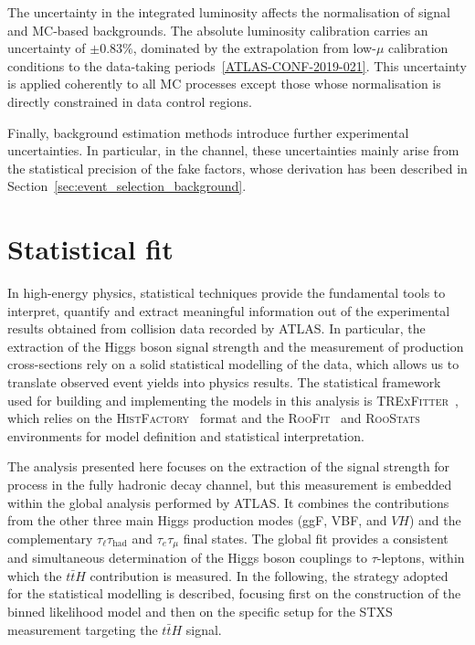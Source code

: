 The uncertainty in the integrated luminosity affects the normalisation of signal and MC-based backgrounds. The absolute luminosity calibration carries an uncertainty of $\pm 0.83\%$, dominated by the extrapolation from low-$\mu$ calibration conditions to the data-taking periods~\ref{ATLAS-CONF-2019-021}. This uncertainty is applied coherently to all MC processes except those whose normalisation is directly constrained in data control regions.  

Finally, background estimation methods introduce further experimental uncertainties. In particular, in the \ttHtt channel, these uncertainties mainly arise from the statistical precision of the fake factors, whose derivation has been described in Section~\ref{sec:event_selection_background}.




\section{Statistical fit}
\label{sec:statistical_tth}

In high-energy physics, statistical techniques provide the fundamental tools to interpret, quantify and extract meaningful information out of the experimental results obtained from collision data recorded by ATLAS.
In particular, the extraction of the Higgs boson signal strength and the measurement of production cross-sections rely on a solid statistical modelling of the data, which allows us to translate observed event yields into physics results. 
The statistical framework used for building and implementing the models in this analysis is \textsc{TRExFitter}~\cite{trexfitter}, which relies on the \textsc{HistFactory}~\cite{histfactory} format and the \textsc{RooFit}~\cite{roofit} and \textsc{RooStats}~\cite{roostats} environments for model definition and statistical interpretation. 

The analysis presented here focuses on the extraction of the signal strength for \ttHtt process in the fully hadronic decay channel, but this measurement is embedded within the global \htautau analysis performed by ATLAS. It combines the contributions from the other three main Higgs production modes (ggF, VBF, and $VH$) and the complementary $\tau_{\ell}\tau_{\mathrm{had}}$ and $\tau_{e}\tau_{\mu}$ final states. 
The global fit provides a consistent and simultaneous determination of the Higgs boson couplings to $\tau$-leptons, within which the $t\bar{t}H$ contribution is measured. 
In the following, the strategy adopted for the statistical modelling is described, focusing first on the construction of the binned likelihood model and then on the specific setup for the STXS measurement targeting the $t\bar{t}H$ signal.

